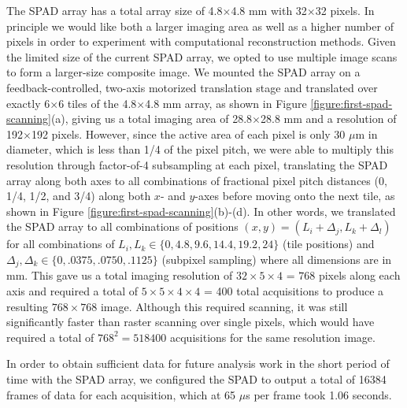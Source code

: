 The SPAD array has a total array size of 4.8$\times$4.8 mm with 32$\times$32 pixels. In principle we would like both a larger imaging area as well as a higher number of pixels in order to experiment with computational reconstruction methods. Given the limited size of the current SPAD array, we opted to use multiple image scans to form a larger-size composite image. We mounted the SPAD array on a feedback-controlled, two-axis motorized translation stage and translated over exactly 6$\times$6 tiles of the 4.8$\times$4.8 mm array, as shown in Figure \ref{figure:first-spad-scanning}(a), giving us a total imaging area of 28.8$\times$28.8 mm and a resolution of 192$\times$192 pixels. However, since the active area of each pixel is only 30 $\mu$m in diameter, which is less than 1/4 of the pixel pitch, we were able to multiply this resolution through factor-of-4 subsampling at each pixel, translating the SPAD array along both axes to all combinations of fractional pixel pitch distances (0, 1/4, 1/2, and 3/4) along both $x$- and $y$-axes before moving onto the next tile, as shown in Figure \ref{figure:first-spad-scanning}(b)-(d). In other words, we translated the SPAD array to all combinations of positions $(x, y) = (L_i + \Delta_j, L_k + \Delta_l)$ for all combinations of $L_i, L_k \in \{ 0, 4.8, 9.6, 14.4, 19.2, 24\}$ (tile positions) and $\Delta_j, \Delta_k \in \{ 0, .0375, .0750, .1125\}$ (subpixel sampling) where all dimensions are in mm. This gave us a total imaging resolution of $32 \times 5 \times 4$ = $768$ pixels along each axis and required a total of $5 \times 5 \times 4 \times 4$ = 400 total acquisitions to produce a resulting $768\times 768$ image. Although this required scanning, it was still significantly faster than raster scanning over single pixels, which would have required a total of $768^2 = 518400$ acquisitions for the same resolution image.

In order to obtain sufficient data for future analysis work in the short period of time with the SPAD array, we configured the SPAD to output a total of 16384 frames of data for each acquisition, which at 65 $\mu$s per frame took 1.06 seconds.

